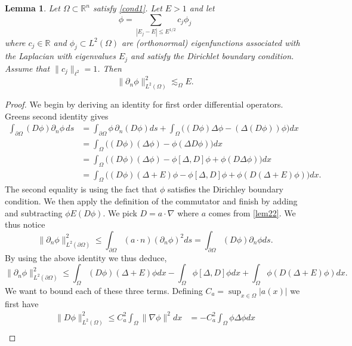 \documentclass{article}
\newcommand{\R}{\mathbb{R}}
\newtheorem{lemma}{Lemma}\newcommand{\lemmaautorefname}{Lemma}
\begin{document}
\begin{lemma}
\label{lem21}
Let $\Omega \subset \R^n$ satisfy \autoref{cond1}.
Let $E > 1$ and let
\[
\phi = \sum_{|E_j - E| \le E^{1/2}} c_j \phi_j
\]
where $c_j \in \R$ and $\phi_j \subset L^2(\Omega)$ are (orthonormal) eigenfunctions associated with the Laplacian with eigenvalues $E_j$ and satisfy the Dirichlet boundary condition.
Assume that $\lVert c_j \rVert_{\ell^2} = 1$.
Then
\[
\lVert \partial_n \phi\rVert_{L^2(\Omega)}^2 \lesssim_\Omega E.
\]
\end{lemma}
\begin{proof}
We begin by deriving an identity for first order differential operators.
Greens second identity gives
\begin{align*}
\int_{\partial \Omega} (D \phi) \partial_n \phi \, ds
& = \int_{\partial \Omega} \phi \, \partial_n (D \phi) ds + \int_{\Omega}  \Big((D \phi)\Delta \phi - (\Delta (D \phi)) \phi \Big) dx \\
& = \int_{\Omega} \Big((D \phi)(\Delta \phi) - \phi (\Delta D \phi)\Big) dx \\
& = \int_{\Omega} \Big((D \phi) (\Delta \phi) - \phi [\Delta, D] \phi + \phi (D \Delta \phi) \Big) dx \\
& = \int_{\Omega} \Big((D \phi) (\Delta + E) \phi - \phi [\Delta, D] \phi + \phi (D (\Delta + E) \phi) \Big) dx.
\end{align*}
The second equality is using the fact that $\phi$ satisfies the Dirichley boundary condition.
We then apply the definition of the commutator and finish by adding and subtracting $\phi E (D \phi)$.
We pick $D = a \cdot \nabla$ where $a$ comes from \autoref{lem22}.
We thus notice
\[
\lVert \partial_n \phi \rVert_{L^2(\partial \Omega)}^2
\le \int_{\partial \Omega} (a \cdot n) (\partial_n \phi)^2 ds
= \int_{\partial \Omega} (D \phi) \partial_n \phi ds.
\]
By using the above identity we thus deduce,
\begin{equation}
\label{eq-3terms}
\lVert \partial_n \phi \rVert_{L^2(\partial \Omega)}^2 \le \int_{\Omega} (D \phi) (\Delta + E) \phi dx - \int_{\Omega} \phi [\Delta, D] \phi dx + \int_{\Omega} \phi (D (\Delta + E) \phi) dx.
\end{equation}
We want to bound each of these three terms.
Defining $C_a = \sup_{x \in \Omega} |a(x)|$ we first have
\begin{align*}
\lVert D \phi \rVert_{L^2(\Omega)}^2 \le C_a^2 \int_{\Omega} \lVert \nabla \phi\rVert^2 dx & = - C_a^2 \int_{\Omega} \phi \Delta \phi dx \\

\end{align*}
\end{proof}
\end{document}
